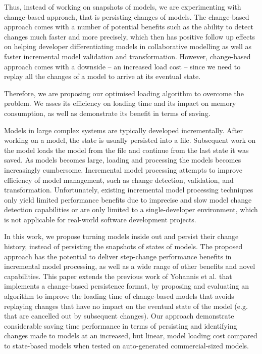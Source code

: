 \documentclass{llncs}
\begin{document}
Thus, instead of working on snapshots of models, we are experimenting with change-based approach, that is persisting changes of models. The change-based approach comes with a number of potential benefits such as the ability to detect changes much faster and more precisely, which then has positive follow up effects on helping developer differentiating models in collaborative modelling as well as faster incremental model validation and transformation. However, change-based approach comes with a downside -- an increased load cost -- since we need to replay all the changes of a model to arrive at its eventual state.   

Therefore, we are proposing our optimised loading algorithm to overcome the problem. We asses its efficiency on loading time and its impact on memory consumption, as well as demonstrate its benefit in terms of saving. 

Models in large complex systems are typically developed incrementally. After working on a model, the state is usually persisted into a file. Subsequent work on the model loads the model from the file and continue from the last state it was saved. As models becomes large, loading and processing the models becomes increasingly cumbersome. Incremental model processing attempts to improve efficiency of model management, such as change detection, validation, and transformation. Unfortunately, existing incremental model processing techniques only yield limited performance benefits due to imprecise and slow model change detection capabilities or are only limited to a single-developer environment, which is not applicable for real-world software development projects.

In this work, we propose turning models inside out and persist their change history, instead of persisting the snapshots of states of models. The proposed approach has the potential to deliver step-change performance benefits in incremental model processing, as well as a wide range of other benefits and novel capabilities. This paper extends the previous work of Yohannis et al. \cite{yohannis2017turning} that implements a change-based persistence format, by proposing and evaluating an algorithm to improve the loading time of change-based models that avoids replaying changes that have no impact on the eventual state of the model (e.g. that are cancelled out by subsequent changes). Our approach demonstrate considerable saving time performance in terms of persisting and identifying changes made to models at an increased, but linear, model loading cost compared to state-based models when tested on auto-generated commercial-sized models.
\end{document}
